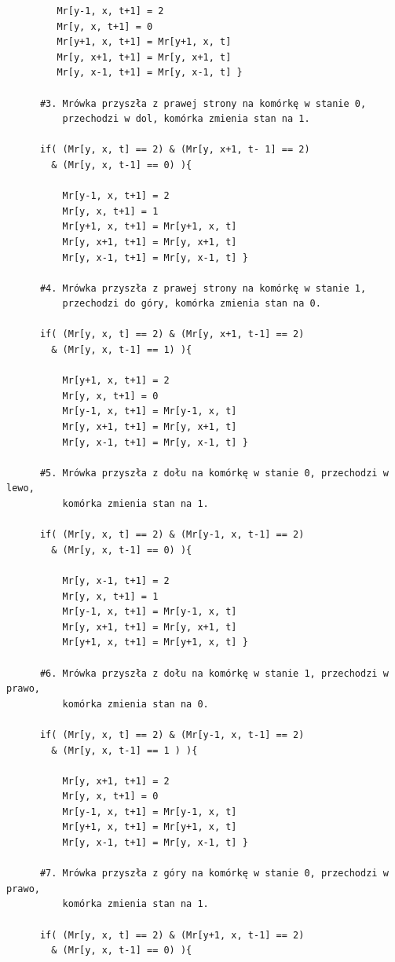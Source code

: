 \documentclass[a4paper,12pt]{article}
\begin{document}
\begin{verbatim}
         Mr[y-1, x, t+1] = 2
         Mr[y, x, t+1] = 0
         Mr[y+1, x, t+1] = Mr[y+1, x, t] 
         Mr[y, x+1, t+1] = Mr[y, x+1, t] 
         Mr[y, x-1, t+1] = Mr[y, x-1, t] }
        
      #3. Mrówka przyszła z prawej strony na komórkę w stanie 0,
          przechodzi w dol, komórka zmienia stan na 1.
        
      if( (Mr[y, x, t] == 2) & (Mr[y, x+1, t- 1] == 2)
        & (Mr[y, x, t-1] == 0) ){
        
          Mr[y-1, x, t+1] = 2
          Mr[y, x, t+1] = 1 
          Mr[y+1, x, t+1] = Mr[y+1, x, t] 
          Mr[y, x+1, t+1] = Mr[y, x+1, t] 
          Mr[y, x-1, t+1] = Mr[y, x-1, t] }
          
      #4. Mrówka przyszła z prawej strony na komórkę w stanie 1,
          przechodzi do góry, komórka zmienia stan na 0.
      
      if( (Mr[y, x, t] == 2) & (Mr[y, x+1, t-1] == 2)
        & (Mr[y, x, t-1] == 1) ){
        
          Mr[y+1, x, t+1] = 2
          Mr[y, x, t+1] = 0
          Mr[y-1, x, t+1] = Mr[y-1, x, t] 
          Mr[y, x+1, t+1] = Mr[y, x+1, t] 
          Mr[y, x-1, t+1] = Mr[y, x-1, t] }    
          
      #5. Mrówka przyszła z dołu na komórkę w stanie 0, przechodzi w lewo,
          komórka zmienia stan na 1.
      
      if( (Mr[y, x, t] == 2) & (Mr[y-1, x, t-1] == 2) 
        & (Mr[y, x, t-1] == 0) ){
        
          Mr[y, x-1, t+1] = 2
          Mr[y, x, t+1] = 1 
          Mr[y-1, x, t+1] = Mr[y-1, x, t] 
          Mr[y, x+1, t+1] = Mr[y, x+1, t] 
          Mr[y+1, x, t+1] = Mr[y+1, x, t] }
          
      #6. Mrówka przyszła z dołu na komórkę w stanie 1, przechodzi w prawo, 
          komórka zmienia stan na 0.
      
      if( (Mr[y, x, t] == 2) & (Mr[y-1, x, t-1] == 2) 
        & (Mr[y, x, t-1] == 1 ) ){
        
          Mr[y, x+1, t+1] = 2
          Mr[y, x, t+1] = 0 
          Mr[y-1, x, t+1] = Mr[y-1, x, t] 
          Mr[y+1, x, t+1] = Mr[y+1, x, t] 
          Mr[y, x-1, t+1] = Mr[y, x-1, t] } 
          
      #7. Mrówka przyszła z góry na komórkę w stanie 0, przechodzi w prawo,
          komórka zmienia stan na 1.
      
      if( (Mr[y, x, t] == 2) & (Mr[y+1, x, t-1] == 2)
        & (Mr[y, x, t-1] == 0) ){
        

\end{verbatim}
\end{document}
